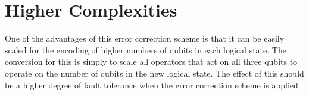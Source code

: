 
\section{Higher Complexities}

One of the advantages of this error correction scheme is that it can be easily scaled for the encoding of higher numbers of qubits in each logical state. The conversion for this is simply to scale all operators that act on all three qubits to operate on the number of qubits in the new logical state. The effect of this should be a higher degree of fault tolerance when the error correction scheme is applied.

